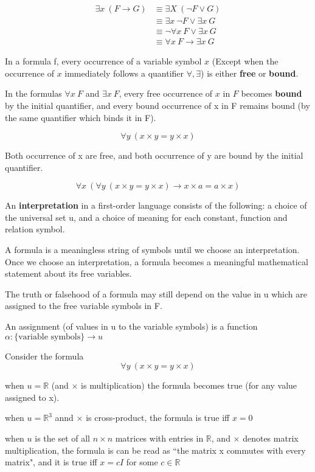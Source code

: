 
\begin{exmp}
\begin{align*}
\exists x \ (F\to G) &\equiv \exists X \ (\neg F \vee G)\\
&\equiv \exists x \ \neg F \vee \exists x \ G\\
&\equiv \neg \forall x \ F \vee \exists x \ G\\
&\equiv \forall x \ F \to \exists x \ G
\end{align*}
\end{exmp}

\begin{defn}
In a formula f, every occurrence of a variable symbol $x$ (Except when the occurrence of $x$ immediately follows a quantifier $\forall , \exists$) is either \textbf{free} or \textbf{bound}.

In the formulas $\forall x \ F$ and $\exists x \ F$, every free occurrence of $x$ in $F$ becomes \textbf{bound} by the initial quantifier, and every bound occurrence of x in F remains bound (by the same quantifier which binds it in F).
\end{defn}

\begin{exmp}
$$\forall y \ (x\times y = y\times x)$$

Both occurrence of x are free, and both occurrence of y are bound by the initial quantifier.

$$\forall x \ (\forall y \ (x\times y = y\times x) \to x\times a = a\times x)$$
\end{exmp}

\begin{defn}
An \textbf{interpretation} in a first-order language consists of the following: a choice of the universal set u, and a choice of meaning for each constant, function and relation symbol.
\end{defn}

A formula is a meaningless string of symbols until we choose an interpretation. Once we choose an interpretation, a formula becomes a meaningful mathematical statement about its free variables.

The truth or falsehood of a formula may still depend on the value in u which are assigned to the free variable symbols in F.

An assignment (of values in u to the variable symbols) is a function $\alpha : \{\text{variable symbols}\}\to u$

\begin{exmp}
Consider the formula $$\forall y \ (x\times y = y\times x)$$

when $u = \mathbb{R}$ (and $\times$ is multiplication) the formula becomes true (for any value assigned to x).

when $u = \mathbb{R}^3$ annd $\times$ is cross-product, the formula is true iff $x=0$

when $u$ is the set of all $n\times n$ matrices with entries in $\mathbb{R}$, and $\times$ denotes matrix multiplication, the formula is can be read as ``the matrix x commutes with every matrix", and it is true iff $x = cI$ for some $c\in \mathbb{R}$
\end{exmp}


